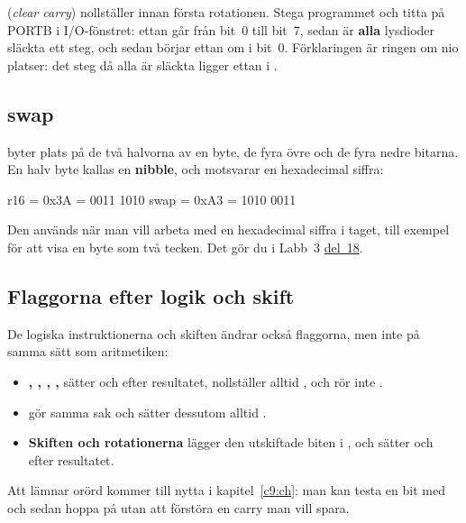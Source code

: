 \noindent{} (\emph{clear carry}) nollställer  innan första rotationen. Stega
programmet och titta på PORTB i I/O-fönstret: ettan går från bit~0 till bit~7, sedan är
\textbf{alla} lysdioder släckta ett steg, och sedan börjar ettan om i bit~0. Förklaringen är ringen
om nio platser: det steg då alla är släckta ligger ettan i .

\subsection{swap}
\label{c8:b5}
\textbf{} byter plats på de två halvorna av en byte, de fyra övre och de fyra nedre
bitarna. En halv byte kallas en \textbf{nibble}, och motsvarar en hexadecimal siffra:

\begin{textdrawing}
   r16  =  0x3A  =  0011 1010
   swap =  0xA3  =  1010 0011
\end{textdrawing}

\noindent Den används när man vill arbeta med en hexadecimal siffra i taget, till exempel för att
visa en byte som två tecken. Det gör du i Labb~3 \hyperref[lab3:d18]{del~18}.

\subsection{Flaggorna efter logik och skift}
\label{c8:b6}
De logiska instruktionerna och skiften ändrar också flaggorna, men inte på samma sätt som
aritmetiken:
\begin{itemize}
  \item \textbf{, , , , } sätter  och
     efter resultatet, nollställer alltid , och rör inte .
  \item \textbf{} gör samma sak och sätter dessutom alltid .
  \item \textbf{Skiften och rotationerna} lägger den utskiftade biten i , och sätter
     och  efter resultatet.
\end{itemize}

Att  lämnar  orörd kommer till nytta i kapitel~\ref{c9:ch}: man kan testa en bit
med  och sedan hoppa på  utan att förstöra en carry man vill spara.
